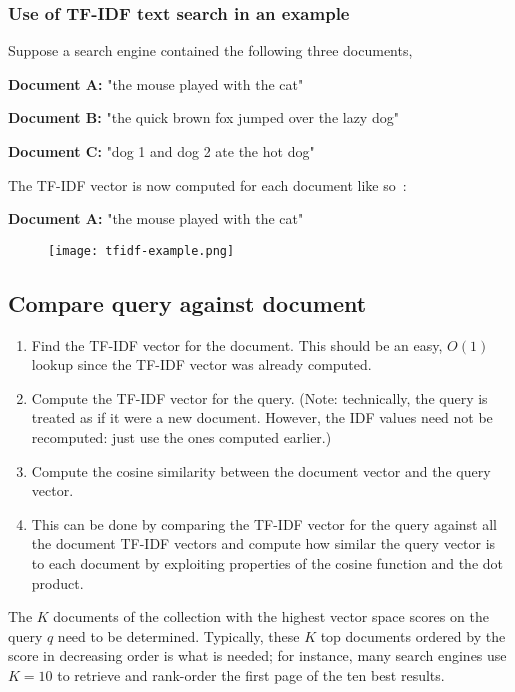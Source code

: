 \subsubsection{Use of TF-IDF text search in an example}

Suppose a search engine contained the following three documents,

\textbf{Document A:} "the mouse played with the cat"

\textbf{Document B:} "the quick brown fox jumped over the lazy dog"

\textbf{Document C:} "dog 1 and dog 2 ate the hot dog"

The TF-IDF vector is now computed for each document like so~\cite{tfidfExample}:

\textbf{Document A:} "the mouse played with the cat"
\begin{figure}[h!]
    \texttt{[image: tfidf-example.png]}
\end{figure}

\subsection{Compare query against document}
\begin{enumerate}
    \item Find the TF-IDF vector for the document. This should be an easy, $O(1)$ lookup since the TF-IDF vector was already computed.
    \item Compute the TF-IDF vector for the query. (Note: technically, the query is treated as if it were a new document. 
    However, the IDF values need not be recomputed: just use the ones computed earlier.)
    \item Compute the cosine similarity between the document vector and the query vector.
    \item This can be done by comparing the TF-IDF vector for the query against all the document TF-IDF vectors and compute how similar the query vector is to each document by exploiting properties of the cosine function and the dot product.
\end{enumerate}

The $K$ documents of the collection with the highest vector space scores on the query $q$ need to be determined. Typically, these $K$ top documents ordered by the score in decreasing order is what is needed; for instance, many search engines use $K = 10$ to retrieve and rank-order the first page of the ten best results.~\cite{tfidfExample}

